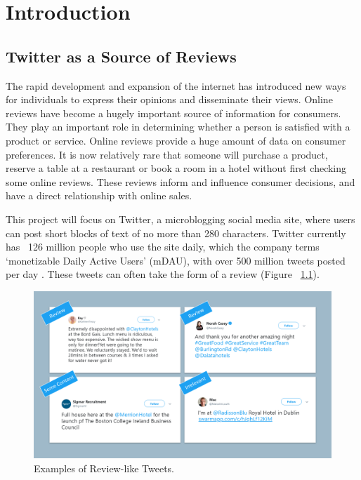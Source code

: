 
\chapter{Introduction}

\section{Twitter as a Source of Reviews}
The rapid development and expansion of the internet has introduced new ways for individuals to express their opinions and disseminate their views. Online reviews have become a hugely important source of information for consumers. They play an important role in determining whether a person is satisfied with a product or service. Online reviews provide a huge amount of data on consumer preferences. It is now relatively rare that someone will purchase a product, reserve a table at a restaurant or book a room in a hotel without first checking some online reviews. These reviews inform and influence consumer decisions, and have a direct relationship with online sales. 

This project will focus on Twitter, a microblogging social media site, where users can post short blocks of text of no more than 280 characters. Twitter currently has ~126 million people who use the site daily, which the company terms `monetizable Daily Active Users' (mDAU), with over 500 million tweets posted per day \cite{Twitter2019}. These tweets can often take the form of a review (Figure ~\ref{fig:tweets}).

\begin{figure}[h!]
\centering
\includegraphics[width=1\textwidth]{introduction/sample_tweets.png}
\caption{\label{fig:tweets} Examples of Review-like Tweets.}
\end{figure}

